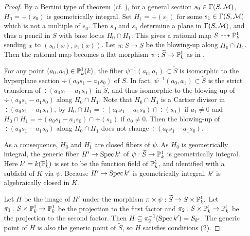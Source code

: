 \documentclass[12pt]{amsart}
\begin{document}
\begin{proof}
By a Bertini type of theorem (cf. \cite[Theorem 6.10]{Jouanolou}), for a general section 
$s_0\in \Gamma(S,\sM)$, $H_0=\div(s_0)$ is geometrically integral.
Set $H_1=\div(s_1)$ for some $s_1\in \Gamma(S,\sM)$ which is not a multiple of $s_0$.
Then $s_0$ and $s_1$ determine a plane in $\Gamma(S,\sM)$, and thus a pencil in $S$ with base locus $H_0\cap H_1$. 
This gives a rational map $S\dashrightarrow \P^1_k$ sending $x$ to $(s_0(x),s_1(x))$. 
Let $\pi:\widetilde S\to S$ be the blowing-up along $H_0\cap H_1$. 
Then the rational map becomes a flat morphism $\psi:\widetilde S\to \P^1_k$ as in \cite[II, Example 7.17.3]{Hartshorne1977}.

For any point $(a_0,a_1)\in \P^1_k(k)$, the fiber $\psi^{-1}(a_0,a_1)\subset \widetilde S$ is isomorphic to the hyperplane section $\div(a_0s_1-a_1s_0)$ of $S$. In fact, $\psi^{-1}(a_0,a_1)\subset \widetilde S$ is the strict transform of 
$\div(a_0s_1-a_1s_0)$ in $\widetilde S$, and thus isomorphic to the blowing-up of $\div(a_0s_1-a_1s_0)$ along $H_0\cap H_1$. Note that $H_0\cap H_1$ is a Cartier divisor in $\div(a_0s_1-a_1s_0)$, by  
$H_0\cap H_1=\div(a_0s_1-a_1s_0)\cap \div(s_0)$ if $a_1\neq 0$ and $H_0\cap H_1=\div(a_0s_1-a_1s_0)\cap \div(s_1)$ if $a_0\neq 0$. 
Then the blowing-up of $\div(a_0s_1-a_1s_0)$ along $H_0\cap H_1$ does not change $\div(a_0s_1-a_1s_0)$. 

As a consequence, $H_0$ and $H_1$ are closed fibers of $\psi$. 
As $H_0$ is geometrically integral, the generic fiber $H' \to \Spec k'$ of $\psi:\widetilde S\to \P^1_k$ is geometrically integral.
Here $k'=k(\P^1_k)$ is set to be the function field of $\P^1_k$, and identified with a subfield of $K$ via $\psi$. 
Because $H' \to \Spec k'$ is geometrically integral,
$k'$ is algebraically closed in $K.$ 

Let $H$ be the image of $H'$ under the morphism $\pi\times \psi: \widetilde S \to S\times \P^1_k.$
Let $\pi_1: S\times \P^1_k\to \P^1_k$ be the projection to the first factor and 
$\pi_2:S\times \P^1_k\to \P^1_k$ be the projection to the second factor. Then $H\subseteq \pi_2^{-1}(\Spec k')=S_{k'}.$
The generic point of $H$ is also the generic point of $\widetilde S$, so $H$
satisfies conditions (2). 


\end{proof}
\end{document}
